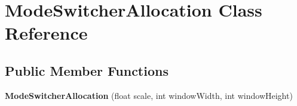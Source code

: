 \hypertarget{classModeSwitcherAllocation}{\section{Mode\-Switcher\-Allocation Class Reference}
\label{classModeSwitcherAllocation}
}
\subsection*{Public Member Functions}
\begin{DoxyCompactItemize}
\item 
\hypertarget{classModeSwitcherAllocation_aad10e944933c343e99ff27751ba3c61e}{{\bfseries Mode\-Switcher\-Allocation} (float scale, int window\-Width, int window\-Height)}\label{classModeSwitcherAllocation_aad10e944933c343e99ff27751ba3c61e}

\end{DoxyCompactItemize}

